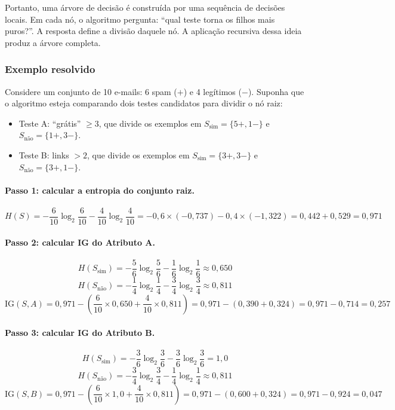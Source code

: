 \documentclass[12pt,a4paper]{article}
\begin{document}
Portanto, uma árvore de decisão é construída por uma sequência de decisões locais. Em cada nó, o algoritmo pergunta: ``qual teste torna os filhos mais puros?''. A resposta define a divisão daquele nó. A aplicação recursiva dessa ideia produz a árvore completa.

\subsubsection{Exemplo resolvido}

Considere um conjunto de 10 e-mails: 6 spam ($+$) e 4 legítimos ($-$). 
Suponha que o algoritmo esteja comparando dois testes candidatos para dividir o nó raiz:

\begin{itemize}[nosep]
    \item Teste A: ``grátis'' $\geq 3$, que divide os exemplos em 
    $S_{\text{sim}} = \{5{+}, 1{-}\}$ e 
    $S_{\text{não}} = \{1{+}, 3{-}\}$.
    
    \item Teste B: links $> 2$, que divide os exemplos em 
    $S_{\text{sim}} = \{3{+}, 3{-}\}$ e 
    $S_{\text{não}} = \{3{+}, 1{-}\}$.
\end{itemize}

\paragraph{Passo 1: calcular a entropia do conjunto raiz.}
\[
H(S) = -\frac{6}{10}\log_2\frac{6}{10} - \frac{4}{10}\log_2\frac{4}{10}
= -0{,}6 \times (-0{,}737) - 0{,}4 \times (-1{,}322)
= 0{,}442 + 0{,}529 = 0{,}971
\]

\paragraph{Passo 2: calcular IG do Atributo A.}
\[
H(S_{\text{sim}}) = -\frac{5}{6}\log_2\frac{5}{6} - \frac{1}{6}\log_2\frac{1}{6} \approx 0{,}650
\]
\[
H(S_{\text{não}}) = -\frac{1}{4}\log_2\frac{1}{4} - \frac{3}{4}\log_2\frac{3}{4} \approx 0{,}811
\]
\[
\text{IG}(S, A) = 0{,}971 - \left(\frac{6}{10} \times 0{,}650 + \frac{4}{10} \times 0{,}811\right)
= 0{,}971 - (0{,}390 + 0{,}324) = 0{,}971 - 0{,}714 = 0{,}257
\]

\paragraph{Passo 3: calcular IG do Atributo B.}
\[
H(S_{\text{sim}}) = -\frac{3}{6}\log_2\frac{3}{6} - \frac{3}{6}\log_2\frac{3}{6} = 1{,}0
\]
\[
H(S_{\text{não}}) = -\frac{3}{4}\log_2\frac{3}{4} - \frac{1}{4}\log_2\frac{1}{4} \approx 0{,}811
\]
\[
\text{IG}(S, B) = 0{,}971 - \left(\frac{6}{10} \times 1{,}0 + \frac{4}{10} \times 0{,}811\right)
= 0{,}971 - (0{,}600 + 0{,}324) = 0{,}971 - 0{,}924 = 0{,}047
\]
\end{document}

